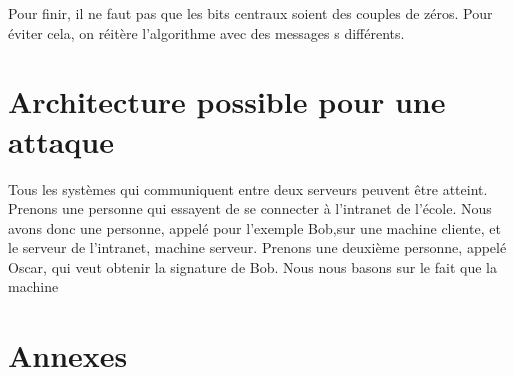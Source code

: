 \documentclass[a4,12pt]{article}
\begin{document}
Pour finir, il ne faut pas que les bits centraux soient des couples de zéros. Pour éviter cela, on réitère l'algorithme avec des messages s différents.


\section{Architecture possible pour une attaque}
Tous les systèmes qui communiquent entre deux serveurs peuvent être atteint. \\
Prenons une personne qui essayent de se connecter à l'intranet de l'école. Nous avons donc une personne, appelé pour l'exemple Bob,sur une machine cliente, et le serveur de l'intranet, machine serveur. Prenons une deuxième personne, appelé Oscar, qui veut obtenir la signature de Bob. Nous nous basons sur le fait que la machine 



\section{Annexes}
\end{document}
